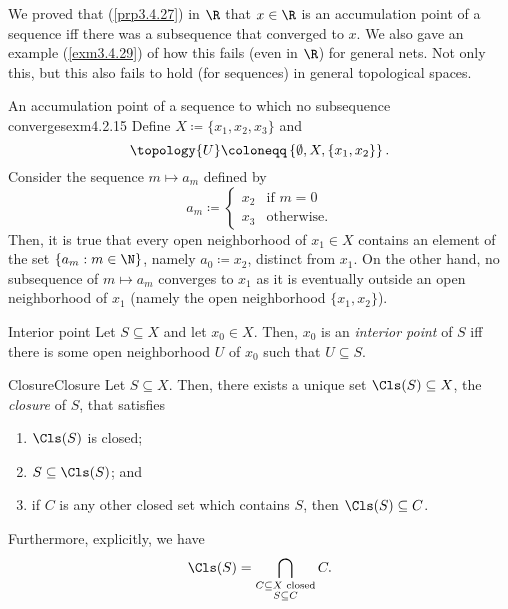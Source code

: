 We proved that (\cref{prp3.4.27}) in $\R$ that $x\in \R$ is an accumulation point of a sequence iff there was a subsequence that converged to $x$.  We also gave an example (\cref{exm3.4.29}) of how this fails (even in $\R$) for general nets.  Not only this, but this also fails to hold (for sequences) in general topological spaces.
\begin{exm}{An accumulation point of a sequence to which no subsequence converges}{exm4.2.15}
Define $X\coloneqq \{ x_1,x_2,x_3\}$ and
\begin{equation}
\topology{U}\coloneqq \left\{ \emptyset ,X,\{ x_1,x_2\} \right\} .
\end{equation}
Consider the sequence $m\mapsto a_m$ defined by
\begin{equation}
a_m\coloneqq \begin{cases}x_2 & \text{if }m=0 \\ x_3 & \text{otherwise.}\end{cases}
\end{equation}
Then, it is true that every open neighborhood of $x_1\in X$ contains an element of the set $\{ a_m:m\in \N \}$, namely $a_0\coloneqq x_2$, distinct from $x_1$.  On the other hand, no subsequence of $m\mapsto a_m$ converges to $x_1$ as it is eventually outside an open neighborhood of $x_1$ (namely the open neighborhood $\{ x_1,x_2\}$).
\end{exm}
\begin{dfn}{Interior point}{}
Let $S\subseteq X$ and let $x_0\in X$.  Then, $x_0$ is an \emph{interior point} of $S$ iff there is some open neighborhood $U$ of $x_0$ such that $U\subseteq S$.
\end{dfn}
\begin{prp}{Closure}{Closure}
Let $S\subseteq X$.  Then, there exists a unique set $\Cls (S)\subseteq X$, the \emph{closure} of $S$, that satisfies
\begin{enumerate}
\item $\Cls (S)$ is closed;
\item $S\subseteq \Cls (S)$; and
\item if $C$ is any other closed set which contains $S$, then $\Cls (S)\subseteq C$.
\end{enumerate}
Furthermore, explicitly, we have
\begin{equation}
\Cls (S)=\bigcap _{\substack{C\subseteq X\text{ closed} \\ S\subseteq C}}C.
\end{equation}
\end{prp}

